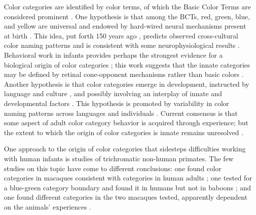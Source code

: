 Color categories are identified by color terms, of which the Basic Color Terms are considered prominent \citep{berlin_basic_1969}.
One hypothesis is that among the BCTs, red, green, blue, and yellow are universal \citep{heider_universals_1972,regier_focal_2005}
and endowed by hard-wired neural mechanisms present at birth \citep{bornstein_categories_1976,lindsey_universality_2006}. 
This idea, put forth 150 years ago \citep{hering_zur_1875}, predicts observed cross-cultural color naming patterns \citep{jameson_evolutionary_2009,baronchelli_modeling_2010,lindsey_hunter-gatherer_2015,abbott_focal_2016}
and is consistent with some neurophysiological results \citep{clifford_electrophysiological_2009,holmes_neurophysiological_2009,brouwer_categorical_2013,bird_categorical_2014,yang_cortical_2016,forder_colour_2017}
. 
Behavioral work in infants provides perhaps the strongest evidence for a biological origin of color categories \citep{franklin_new_2004,ozturk_language_2013}; this work suggests that the innate categories may be defined by retinal cone-opponent mechanisms rather than basic colors \citep{skelton_biological_2017,maule_color_2019}.
Another hypothesis is that color categories emerge in development, instructed by language and culture \citep{roberson_color_2005, regier_language_2009, cibelli_sapir-whorf_2016}, and possibly involving an interplay of innate and developmental factors \citep{kay_language_2006,franklin_lateralization_2008,regier_language_2009}. 
This hypothesis is promoted by variability in color naming patterns across languages and individuals \citep{davidoff_colour_1999,roberson_color_2000,paramei_online_2018,webster_variations_2002}.
Current consensus is that some aspect of adult color category behavior is acquired through experience; but the extent to which the origin of color categories is innate remains unresolved \citep{davidoff_nature_2009,skelton_colour_2023}.

One approach to the origin of color categories that sidesteps difficulties working with human infants is studies of trichromatic non-human primates. 
The few studies on this topic have come to different conclusions: one found color categories in macaques consistent with categories in human adults \citep{sandell_color_1979}; one tested for a blue-green category boundary and found it in humans but not in baboons \citep{fagot_cross-species_2006}; and one found different categories in the two macaques tested, apparently dependent on the animals’ experiences \citep{panichello_error-correcting_2019}.


